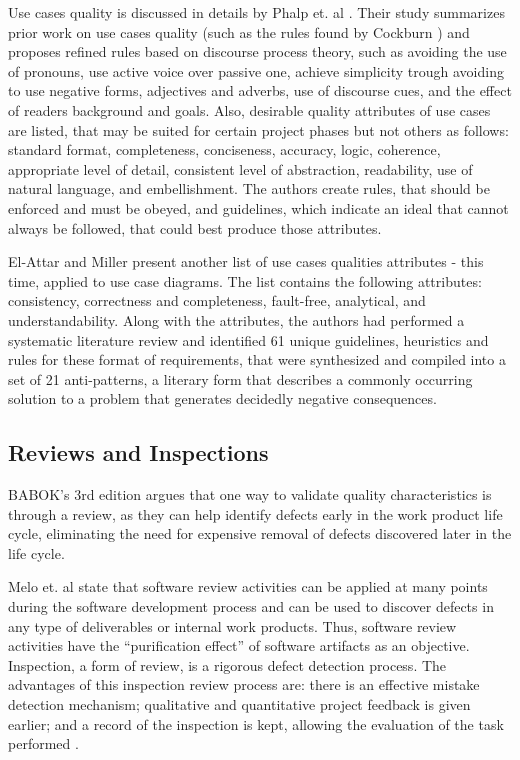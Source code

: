 Use cases quality is discussed in details by Phalp et. al \cite{Phalp_et_dot_al_2011}. Their study summarizes prior work on use cases quality (such as the rules found by Cockburn \cite{Cockburn_2000}) and proposes refined rules based on discourse process theory, such as avoiding the use of pronouns, use active voice over passive one, achieve simplicity trough avoiding to use negative forms, adjectives and adverbs, use of discourse cues, and the effect of readers background and goals. Also, desirable quality attributes of use cases are listed, that may be suited for certain project phases but not others as follows: standard format, completeness, conciseness, accuracy, logic, coherence, appropriate level of detail, consistent level of abstraction, readability, use of natural language, and embellishment. The authors create rules, that should be enforced and must be obeyed, and guidelines, which indicate an ideal that cannot always be followed, that could best produce those attributes. 

El-Attar and Miller \cite{Attar_2012} present another list of use cases qualities attributes - this time, applied to use case diagrams. The list contains the following attributes: consistency, correctness and completeness, fault-free, analytical, and understandability. Along with the attributes, the authors had performed a systematic literature review and identified 61 unique guidelines, heuristics and rules for these format of requirements, that were synthesized and compiled into a set of 21 anti-patterns, a literary form that describes a commonly occurring solution to a problem that generates decidedly negative consequences.

\subsection{Reviews and Inspections}

BABOK's 3rd edition \cite{Babok_2015} argues that one way to validate quality characteristics is through a review, as they can help identify defects early in the work product life cycle, eliminating the need for expensive removal of defects discovered later in the life cycle. 

Melo et. al \cite{Melo_et_dot_al_2001} state that software review activities can be applied at many points during the software development process and can be used to discover defects in any type of deliverables or internal work products. Thus, software review activities have the ``purification effect'' of software artifacts as an objective. Inspection, a form of review, is a rigorous defect detection process. The advantages of this inspection review process are: there is an effective mistake detection mechanism; qualitative and quantitative project feedback is given earlier; and a record of the inspection is kept, allowing the evaluation of the task performed \cite{Melo_et_dot_al_2001}. 

